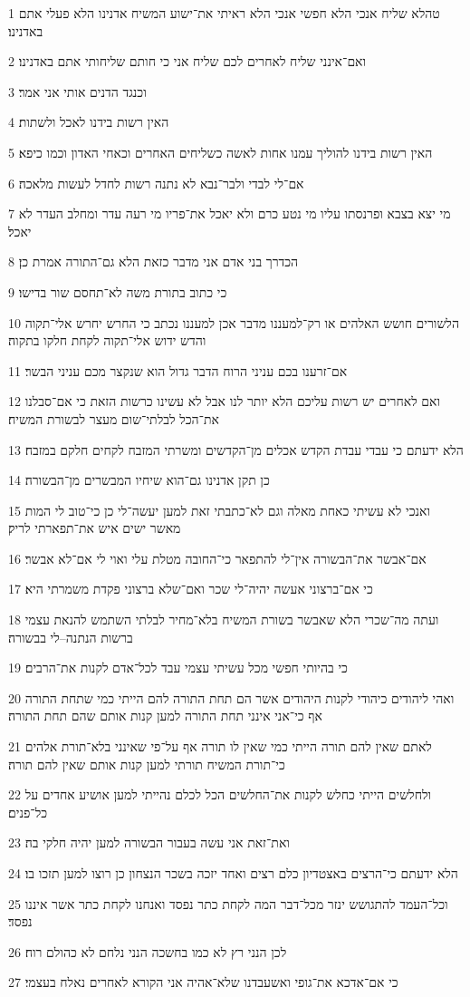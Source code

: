 \par 1 טהלא שליח אנכי הלא חפשי אנכי הלא ראיתי את־ישוע המשיח אדנינו הלא פעלי אתם באדנינו׃
\par 2 ואם־אינני שליח לאחרים לכם שליח אני כי חותם שליחותי אתם באדנינו׃
\par 3 וכנגד הדנים אותי אני אמר׃
\par 4 האין רשות בידנו לאכל ולשתות׃
\par 5 האין רשות בידנו להוליך עמנו אחות לאשה כשליחים האחרים וכאחי האדון וכמו כיפא׃
\par 6 אם־לי לבדי ולבר־נבא לא נתנה רשות לחדל לעשות מלאכה׃
\par 7 מי יצא בצבא ופרנסתו עליו מי נטע כרם ולא יאכל את־פריו מי רעה עדר ומחלב העדר לא יאכל׃
\par 8 הכדרך בני אדם אני מדבר כזאת הלא גם־התורה אמרת כן׃
\par 9 כי כתוב בתורת משה לא־תחסם שור בדישו׃
\par 10 הלשורים חושש האלהים או רק־למעננו מדבר אכן למעננו נכתב כי החרש יחרש אלי־תקוה והדש ידוש אלי־תקוה לקחת חלקו בתקוה׃
\par 11 אם־זרענו בכם עניני הרוח הדבר גדול הוא שנקצר מכם עניני הבשר׃
\par 12 ואם לאחרים יש רשות עליכם הלא יותר לנו אבל לא עשינו כרשות הזאת כי אם־סבלנו את־הכל לבלתי־שום מעצר לבשורת המשיח׃
\par 13 הלא ידעתם כי עבדי עבדת הקדש אכלים מן־הקדשים ומשרתי המזבח לקחים חלקם במזבח׃
\par 14 כן תקן אדנינו גם־הוא שיחיו המבשרים מן־הבשורה׃
\par 15 ואנכי לא עשיתי כאחת מאלה וגם לא־כתבתי זאת למען יעשה־לי כן כי־טוב לי המות מאשר ישים איש את־תפארתי לריק׃
\par 16 אם־אבשר את־הבשורה אין־לי להתפאר כי־החובה מטלת עלי ואוי לי אם־לא אבשר׃
\par 17 כי אם־ברצוני אעשה יהיה־לי שכר ואם־שלא ברצוני פקדת משמרתי היא׃
\par 18 ועתה מה־שכרי הלא שאבשר בשורת המשיח בלא־מחיר לבלתי השתמש להנאת עצמי ברשות הנתנה--לי בבשורה׃
\par 19 כי בהיותי חפשי מכל עשיתי עצמי עבד לכל־אדם לקנות את־הרבים׃
\par 20 ואהי ליהודים כיהודי לקנות היהודים אשר הם תחת התורה להם הייתי כמי שתחת התורה אף כי־אני אינני תחת התורה למען קנות אותם שהם תחת התורה׃
\par 21 לאתם שאין להם תורה הייתי כמי שאין לו תורה אף על־פי שאינני בלא־תורת אלהים כי־תורת המשיח תורתי למען קנות אותם שאין להם תורה׃
\par 22 ולחלשים הייתי כחלש לקנות את־החלשים הכל לכלם נהייתי למען אושיע אחדים על כל־פנים׃
\par 23 ואת־זאת אני עשה בעבור הבשורה למען יהיה חלקי בה׃
\par 24 הלא ידעתם כי־הרצים באצטדיון כלם רצים ואחד יזכה בשכר הנצחון כן רוצו למען תזכו בו׃
\par 25 וכל־העמד להתגושש ינזר מכל־דבר המה לקחת כתר נפסד ואנחנו לקחת כתר אשר איננו נפסד׃
\par 26 לכן הנני רץ לא כמו בחשכה הנני נלחם לא כהולם רוח׃
\par 27 כי אם־אדכא את־גופי ואשעבדנו שלא־אהיה אני הקורא לאחרים נאלח בעצמי׃

